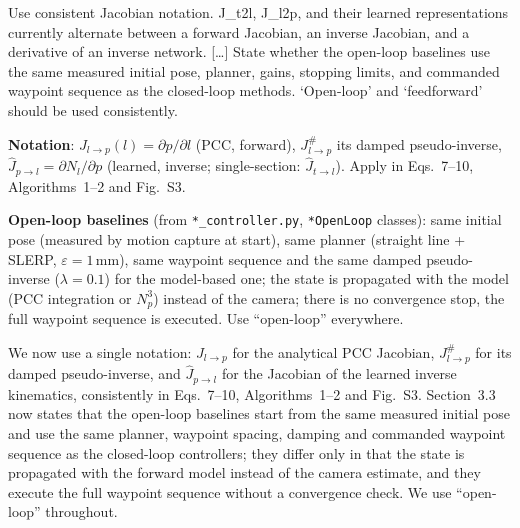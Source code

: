 \documentclass[10pt,a4paper]{article}
\begin{document}
\begin{rev}
Use consistent Jacobian notation. J\_t2l, J\_l2p, and their learned representations currently alternate between a forward Jacobian, an inverse Jacobian, and a derivative of an inverse network. [\dots] State whether the open-loop baselines use the same measured initial pose, planner, gains, stopping limits, and commanded waypoint sequence as the closed-loop methods. `Open-loop' and `feedforward' should be used consistently.
\end{rev}
\begin{todo}
\textbf{Notation}: $J_{l\to p}(l)=\partial p/\partial l$ (PCC, forward), $J^\#_{l\to p}$ its damped pseudo-inverse, $\hat J_{p\to l}=\partial N_l/\partial p$ (learned, inverse; single-section: $\hat J_{t\to l}$). Apply in Eqs.~7--10, Algorithms~1--2 and Fig.~S3.

\textbf{Open-loop baselines} (from \texttt{*\_controller.py}, \texttt{*OpenLoop} classes): same initial pose (measured by motion capture at start), same planner (straight line + SLERP, $\varepsilon=1$\,mm), same waypoint sequence and the same damped pseudo-inverse ($\lambda=0.1$) for the model-based one; the state is propagated with the model (PCC integration or $N_p^3$) instead of the camera; there is no convergence stop, the full waypoint sequence is executed. Use ``open-loop'' everywhere.
\end{todo}
\begin{resp}
We now use a single notation: $J_{l\to p}$ for the analytical PCC Jacobian, $J^\#_{l\to p}$ for its damped pseudo-inverse, and $\hat J_{p\to l}$ for the Jacobian of the learned inverse kinematics, consistently in Eqs.~7--10, Algorithms~1--2 and Fig.~S3. Section~3.3 now states that the open-loop baselines start from the same measured initial pose and use the same planner, waypoint spacing, damping and commanded waypoint sequence as the closed-loop controllers; they differ only in that the state is propagated with the forward model instead of the camera estimate, and they execute the full waypoint sequence without a convergence check. We use ``open-loop'' throughout.
\end{resp}
\end{document}
